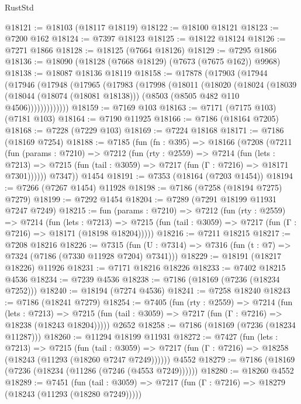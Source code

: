 \begin{lexlean}{RustStd}
\begin{coremodule}
{\begin{coremodule}
{{{{{{{{{{{{{{{{{{{{{{{{{{{{{{{{@18121 := @18103 (@18117 @18119)
@18122 := @18100 @18121
@18123 := @7200 @162
@18124 := @7397 @18123
@18125 := @18122 @18124
@18126 := @7271 @1866
@18128 := @18125 (@7664 @18126)
@18129 := @7295 @1866
@18136 := @18090 (@18128 (@7668 @18129) (@7673 (@7675 @162)) @9968)
@18138 := @18087 @18136 @18119
@18158 := @17878
    (@17903
      (@17944
        (@17946
          (@17948
            (@17965
              (@17983
                (@17998
                  (@18011
                    (@18020
                      (@18024
                        (@18039
                          (@18044 (@18074 (@18081 @18138)))
                          (@8503 (@8505 @482 @110 @4506)))))))))))))
@18159 := @7169 @103
@18163 := @7171 (@7175 @103) (@7181 @103)
@18164 := @7190 @11925
@18166 := @7186 (@18164 @7205)
@18168 := @7228 (@7229 @103)
@18169 := @7224 @18168
@18171 := @7186 (@18169 @7254)
@18188 := @7185
    (fun (fn : @395) =>
    @18166
      (@7208
        (@7211
          (fun (params : @7210) =>
          @7212
            (fun (rty : @2559) =>
            @7214
              (fun (lets : @7213) =>
              @7215 (fun (tail : @3059) => @7217 (fun (Γ : @7216) => @18171 @7301))))))
        @7347))
    @1454
@18191 := @7353 (@18164 (@7203 @1454))
@18194 := @7266 (@7267 @1454) @11928
@18198 := @7186 (@7258 (@18194 @7275) @7279)
@18199 := @7292 @1454
@18204 := @7289 (@7291 @18199 @11931 @7247 @7249)
@18215 := fun (params : @7210) =>
  @7212
    (fun (rty : @2559) =>
    @7214
      (fun (lets : @7213) =>
      @7215 (fun (tail : @3059) => @7217 (fun (Γ : @7216) => @18171 (@18198 @18204)))))
@18216 := @7211 @18215
@18217 := @7208 @18216
@18226 := @7315
    (fun (U : @7314) => @7316 (fun (t : @7) => @7324 (@7186 (@7330 @11928 @7204) @7341)))
@18229 := @18191 (@18217 @18226) @11926
@18231 := @7171 @18216 @18226
@18233 := @7402 @18215 @4536
@18234 := @7239 @4536
@18238 := @7186 (@18169 (@7236 (@18234 @7252)))
@18240 := @18194 (@7274 @4536)
@18241 := @7258 @18240
@18243 := @7186 (@18241 @7279)
@18254 := @7405
    (fun (rty : @2559) =>
    @7214
      (fun (lets : @7213) =>
      @7215 (fun (tail : @3059) => @7217 (fun (Γ : @7216) => @18238 (@18243 @18204)))))
    @2652
@18258 := @7186 (@18169 (@7236 (@18234 @11287)))
@18260 := @11294 @18199 @11931
@18272 := @7427
    (fun (lets : @7213) =>
    @7215
      (fun (tail : @3059) =>
      @7217 (fun (Γ : @7216) => @18258 (@18243 (@11293 (@18260 @7247 @7249))))))
    @4552
@18279 := @7186 (@18169 (@7236 (@18234 (@11286 (@7246 (@4553 @7249))))))
@18280 := @18260 @4552
@18289 := @7451
    (fun (tail : @3059) => @7217 (fun (Γ : @7216) => @18279 (@18243 (@11293 (@18280 @7249)))))
}}}}}}}}}}}}}}}}}}}}}}}}}}}}}}}}
\end{coremodule}}
\end{coremodule}
\end{lexlean}
